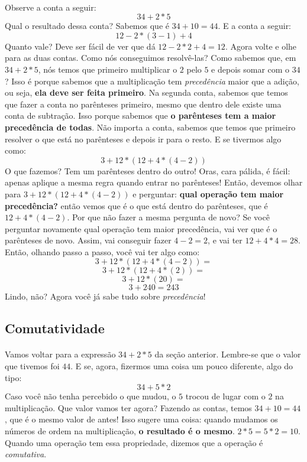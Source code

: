 \documentclass{article}
\begin{document}
\paragraph{}
Observe a conta a seguir:
\begin{equation}
34 + 2*5
\end{equation}
Qual o resultado dessa conta? Sabemos que é $34 + 10 = 44$. E a conta 
a seguir: 
\begin{equation}
12 - 2*(3 - 1) + 4
\end{equation}
Quanto vale? Deve ser fácil de ver que dá $12 - 2*2 + 4 = 12$. Agora volte e 
olhe para as duas contas. Como nós conseguimos resolvê-las? Como sabemos que, em
$34 + 2*5$, nós temos que primeiro multiplicar o $2$ pelo $5$ e depois somar com
o $34$? Isso é porque sabemos que a multiplicação tem \textit{precedência} maior
que a adição, ou seja, \textbf{ela deve ser feita primeiro}. Na segunda conta,
sabemos que temos que fazer a conta no parênteses primeiro, mesmo que dentro
dele existe uma conta de subtração. Isso porque sabemos que \textbf{o parênteses
tem a maior precedência de todas}. Não importa a conta, sabemos que temos que 
primeiro resolver o que está no parênteses e depois ir para o resto. 
E se tivermos algo como:
$$3 + 12*(12 + 4*(4 - 2))$$
O que fazemos? Tem um parênteses dentro do outro! Oras, cara pálida, é fácil:
apenas aplique a mesma regra quando entrar no parênteses! Então, devemos olhar
para $3 + 12*(12 + 4*(4 - 2))$ e perguntar: \textbf{qual operação tem maior 
precedência?} então vemos que é o que está dentro do parênteses, que é 
$12 + 4*(4 - 2)$. Por que não fazer a mesma pergunta de novo? Se você perguntar
novamente qual operação tem maior precedência, vai ver que é o parênteses de 
novo. Assim, vai conseguir fazer $4 - 2 = 2$, e vai ter $12 + 4*4 = 28$. Então,
olhando passo a passo, você vai ter algo como:
$$3 + 12*(12 + 4*(4 - 2)) =$$
$$3 + 12*(12 + 4*(2)) =$$
$$3 + 12*(20) =$$
$$3 + 240 = 243$$
Lindo, não? Agora você já sabe tudo sobre \textit{precedência}!

\subsection{Comutatividade}
\paragraph{}
Vamos voltar para a expressão $34 + 2*5$ da seção anterior. Lembre-se que o 
valor que tivemos foi $44$. E se, agora, fizermos uma coisa um pouco diferente,
algo do tipo:
$$34 + 5*2$$
Caso você não tenha percebido o que mudou, o $5$ trocou de lugar com o $2$ na 
multiplicação. Que valor vamos ter agora? Fazendo as contas, temos 
$34 + 10 = 44$, que é o mesmo valor de antes! Isso sugere uma coisa: quando 
mudamos os números de ordem na multiplicação, \textbf{o resultado é o mesmo}.
$2*5 = 5*2 = 10$. Quando uma operação tem essa propriedade, dizemos que a 
operação é \textit{comutativa}. 
\end{document}
